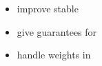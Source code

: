 \begin{itemize}
	\item improve stable \pcc{}
	\item give guarantees for \gtx{}
	\item handle weights in \gtx{}
\end{itemize}
